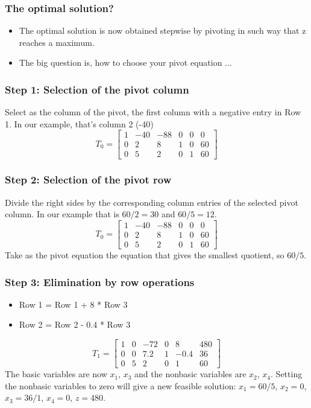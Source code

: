 \begin{frame}
  \frametitle{The optimal solution?}
  \begin{itemize}
    \item The optimal solution is now obtained stepwise by pivoting in such way that z reaches a maximum. 
    \item The big question is, how to choose your pivot equation ...
  \end{itemize}
\end{frame}

\begin{frame}
  \frametitle{Step 1: Selection of the pivot column}
  Select as the column of the pivot, the first column with a negative entry in Row 1. In our example, that’s column 2 (-40)
     \[
T_0 = \begin{bmatrix}
1 & -40 & -88 & 0 & 0 & 0\\ 
0 & 2 & 8 & 1 & 0 & 60\\
0 & 5 & 2 & 0 & 1 &60 
\end{bmatrix}
   \]
\end{frame}

\begin{frame}
  \frametitle{Step 2: Selection of the pivot row}
  Divide the right sides by the corresponding column entries of the selected pivot column. In our example that is $60/2 = 30$ and $60/5 = 12$.
     \[
T_0 = \begin{bmatrix}
1 & -40 & -88 & 0 & 0 & 0\\ 
0 & 2 & 8 & 1 & 0 & 60\\
0 & 5 & 2 & 0 & 1 &60 
\end{bmatrix}
   \]
   Take as the pivot equation the equation that gives the smallest quotient, so $60/5$.
\end{frame}

\begin{frame}
  \frametitle{Step 3: Elimination by row operations}
  \begin{itemize}
    \item Row 1 = Row 1 + 8 * Row 3
    \item Row 2 = Row 2 - 0.4 * Row 3
  \end{itemize}
     \[
T_1 = \begin{bmatrix}
1 & 0 & -72 & 0 & 8 & 480\\ 
0 & 0 & 7.2 & 1 & -0.4 & 36\\
0 & 5 & 2 & 0 & 1 &60 
\end{bmatrix}
   \]
   The basic variables are now $x_1$, $x_3$ and the nonbasic variables are $x_2$, $x_4$. Setting the nonbasic variables to zero will give a new feasible solution: $x_1 = 60/5$, $x_2 = 0$, $x_3 = 36/1$, $x_4 = 0$, $z =480$.
\end{frame}

